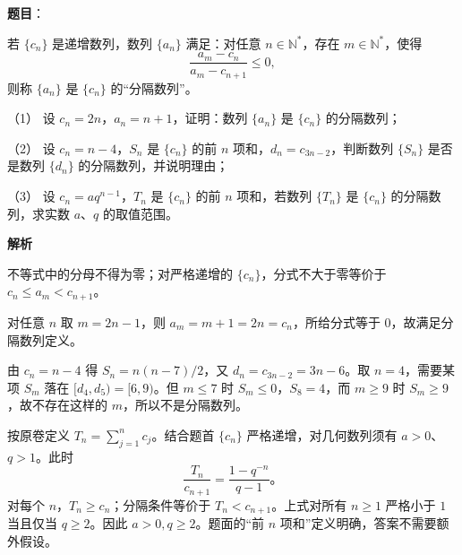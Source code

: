\begin{answer}

\textbf{题目}：

若 $\{c_n\}$ 是递增数列，数列 $\{a_n\}$ 满足：对任意 $n\in\mathbb N^*$，存在 $m\in\mathbb N^*$，使得
\nopagebreak[4]
\[
\frac{a_m-c_n}{a_m-c_{n+1}}\leq0,
\]
则称 $\{a_n\}$ 是 $\{c_n\}$ 的“分隔数列”。

（1） 设 $c_n=2n$，$a_n=n+1$，证明：数列 $\{a_n\}$ 是 $\{c_n\}$ 的分隔数列；

（2） 设 $c_n=n-4$，$S_n$ 是 $\{c_n\}$ 的前 $n$ 项和，$d_n=c_{3n-2}$，判断数列 $\{S_n\}$ 是否是数列 $\{d_n\}$ 的分隔数列，并说明理由；

（3） 设 $c_n=aq^{n-1}$，$T_n$ 是 $\{c_n\}$ 的前 $n$ 项和，若数列 $\{T_n\}$ 是 $\{c_n\}$ 的分隔数列，求实数 $a\text{、}q$ 的取值范围。

\textbf{解析}

不等式中的分母不得为零；对严格递增的 $\{c_n\}$，分式不大于零等价于 $c_n\leq a_m<c_{n+1}$。


对任意 $n$ 取 $m=2n-1$，则 $a_m=m+1=2n=c_n$，所给分式等于 $0$，故满足分隔数列定义。


由 $c_n=n-4$ 得 $S_n=n(n-7)/2$，又 $d_n=c_{3n-2}=3n-6$。取 $n=4$，需要某项 $S_m$ 落在 $[d_4,d_5)=[6,9)$。但 $m\leq7$ 时 $S_m\leq0$，$S_8=4$，而 $m\geq9$ 时 $S_m\geq9$，故不存在这样的 $m$，所以不是分隔数列。


按原卷定义 $T_n=\sum_{j=1}^n c_j$。结合题首 $\{c_n\}$ 严格递增，对几何数列须有 $a>0$、$q>1$。此时
\nopagebreak[4]
\[
\frac{T_n}{c_{n+1}}=\frac{1-q^{-n}}{q-1}\mbox{。}
\]
对每个 $n$，$T_n\geq c_n$；分隔条件等价于 $T_n<c_{n+1}$。上式对所有 $n\geq1$ 严格小于 $1$ 当且仅当 $q\geq2$。因此 $a>0,q\geq2$。题面的“前 $n$ 项和”定义明确，答案不需要额外假设。




\end{answer}